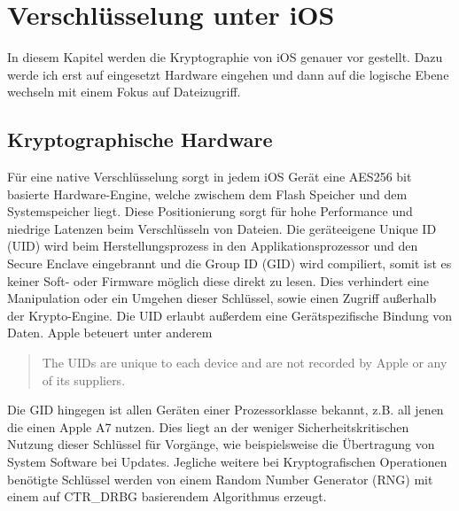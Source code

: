 \section{Verschlüsselung unter iOS}
	In diesem Kapitel werden die Kryptographie von iOS genauer vor gestellt.
	Dazu werde ich erst auf eingesetzt Hardware eingehen und dann auf die logische
	Ebene wechseln mit einem Fokus auf Dateizugriff.
	\subsection{Kryptographische Hardware}\label{sec:crypto-engine}
		Für eine native Verschlüsselung sorgt in jedem iOS Gerät eine AES256 bit
		basierte Hardware-Engine, welche zwischem dem Flash	Speicher und dem
		Systemspeicher liegt. Diese Positionierung sorgt für hohe Performance und
		niedrige Latenzen beim Verschlüsseln von Dateien. Die geräteeigene Unique ID
		(UID) wird beim Herstellungsprozess in den Applikationsprozessor und den Secure
		Enclave eingebrannt und die Group ID (GID) wird compiliert, somit ist es keiner
		Soft- oder Firmware möglich diese direkt zu lesen. Dies verhindert eine
		Manipulation oder ein Umgehen dieser Schlüssel, sowie einen Zugriff außerhalb
		der Krypto-Engine. Die UID erlaubt außerdem eine Gerätspezifische Bindung von
		Daten.
		Apple beteuert unter anderem
		\begin{quote}
			The UIDs are unique to each device and are not recorded by Apple or any of its
			suppliers.\cite[S.9]{iOSSecurityApr2015}
		\end{quote}
		Die GID hingegen ist allen Geräten einer Prozessorklasse bekannt, z.B. all
		jenen die einen Apple A7 nutzen. Dies liegt an der weniger
		Sicherheitskritischen Nutzung dieser Schlüssel für Vorgänge,
		wie beispielsweise die Übertragung von System Software bei Updates. Jegliche
		weitere bei Kryptografischen Operationen benötigte Schlüssel werden von einem
		Random Number Generator (RNG) mit einem auf	CTR\_DRBG\cite{NISTDRBG2012}
		basierendem Algorithmus erzeugt.
